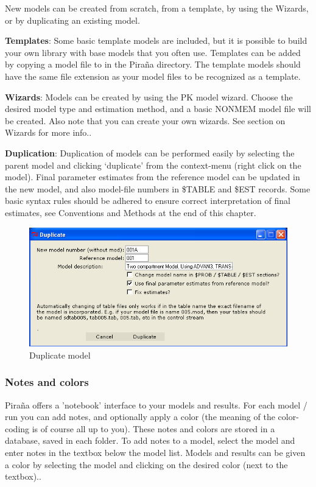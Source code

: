 \documentclass[a4,11pt]{report} \usepackage[pdftex]{graphicx}
\begin{document}
New models can be created from scratch, from a template, by using the
Wizards, or by duplicating an existing model. 

\textbf{Templates}: Some basic template models are included, but it is possible
to build your own library with base models that you often
use. Templates can be added by copying a model file to
\normalfont in the Pira\~na directory. The
template models should have the same file extension as your model
files to be recognized as a template.

\textbf{Wizards}: Models can be created by using the PK model
wizard. Choose the desired model type and estimation method, and a
basic NONMEM model file will be created. Also note that you can create
your own wizards. See section on Wizards for more info..

\textbf{Duplication}: Duplication of models can be performed easily by
selecting the parent model and clicking `duplicate' from the
context-menu (right click on the model).  Final parameter estimates
from the reference model can be updated in the new model, and also
model-file numbers in \$TABLE and \$EST records. Some basic syntax
rules should be adhered to ensure correct interpretation of final
estimates, see Conventions and Methods at the end of this chapter.

\begin{figure}[hbt] \centering
    \includegraphics[scale=0.4]{images/duplicate.png}
    \caption{Duplicate model}
\end{figure}

\subsubsection*{Notes and colors}
Pira\~na offers a 'notebook' interface to your models and results. For
each model / run you can add notes, and optionally apply a color (the
meaning of the color-coding is of course all up to you). These notes
and colors are stored in a database, saved in each folder. To add
notes to a model, select the model and enter notes in the textbox
below the model list. Models and results can be given a color by
selecting the model and clicking on the desired color (next to the
textbox)..
\end{document}
